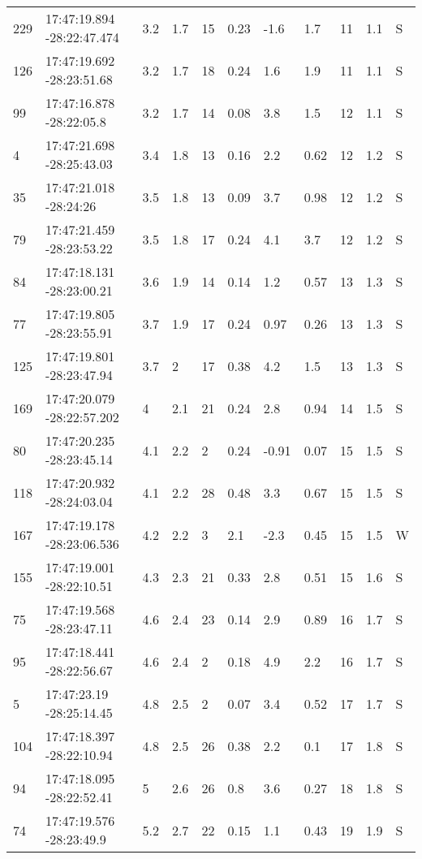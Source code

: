 \begin{deluxetable}[htp]
\begin{tabular}{lllllllllll}
229 & 17:47:19.894 -28:22:47.474 & 3.2 & 1.7 & 15 & 0.23 & -1.6 & 1.7 & 11 & 1.1\ee{25} & S \\
126 & 17:47:19.692 -28:23:51.68 & 3.2 & 1.7 & 18 & 0.24 & 1.6 & 1.9 & 11 & 1.1\ee{25} & S \\
99 & 17:47:16.878 -28:22:05.8 & 3.2 & 1.7 & 14 & 0.08 & 3.8 & 1.5 & 12 & 1.1\ee{25} & S \\
4 & 17:47:21.698 -28:25:43.03 & 3.4 & 1.8 & 13 & 0.16 & 2.2 & 0.62 & 12 & 1.2\ee{25} & S \\
35 & 17:47:21.018 -28:24:26 & 3.5 & 1.8 & 13 & 0.09 & 3.7 & 0.98 & 12 & 1.2\ee{25} & S \\
79 & 17:47:21.459 -28:23:53.22 & 3.5 & 1.8 & 17 & 0.24 & 4.1 & 3.7 & 12 & 1.2\ee{25} & S \\
84 & 17:47:18.131 -28:23:00.21 & 3.6 & 1.9 & 14 & 0.14 & 1.2 & 0.57 & 13 & 1.3\ee{25} & S \\
77 & 17:47:19.805 -28:23:55.91 & 3.7 & 1.9 & 17 & 0.24 & 0.97 & 0.26 & 13 & 1.3\ee{25} & S \\
125 & 17:47:19.801 -28:23:47.94 & 3.7 & 2 & 17 & 0.38 & 4.2 & 1.5 & 13 & 1.3\ee{25} & S \\
169 & 17:47:20.079 -28:22:57.202 & 4 & 2.1 & 21 & 0.24 & 2.8 & 0.94 & 14 & 1.5\ee{25} & S \\
80 & 17:47:20.235 -28:23:45.14 & 4.1 & 2.2 & 2 & 0.24 & -0.91 & 0.07 & 15 & 1.5\ee{25} & S \\
118 & 17:47:20.932 -28:24:03.04 & 4.1 & 2.2 & 28 & 0.48 & 3.3 & 0.67 & 15 & 1.5\ee{25} & S \\
167 & 17:47:19.178 -28:23:06.536 & 4.2 & 2.2 & 3 & 2.1 & -2.3 & 0.45 & 15 & 1.5\ee{25} & W \\
155 & 17:47:19.001 -28:22:10.51 & 4.3 & 2.3 & 21 & 0.33 & 2.8 & 0.51 & 15 & 1.6\ee{25} & S \\
75 & 17:47:19.568 -28:23:47.11 & 4.6 & 2.4 & 23 & 0.14 & 2.9 & 0.89 & 16 & 1.7\ee{25} & S \\
95 & 17:47:18.441 -28:22:56.67 & 4.6 & 2.4 & 2 & 0.18 & 4.9 & 2.2 & 16 & 1.7\ee{25} & S \\
5 & 17:47:23.19 -28:25:14.45 & 4.8 & 2.5 & 2 & 0.07 & 3.4 & 0.52 & 17 & 1.7\ee{25} & S \\
104 & 17:47:18.397 -28:22:10.94 & 4.8 & 2.5 & 26 & 0.38 & 2.2 & 0.1 & 17 & 1.8\ee{25} & S \\
94 & 17:47:18.095 -28:22:52.41 & 5 & 2.6 & 26 & 0.8 & 3.6 & 0.27 & 18 & 1.8\ee{25} & S \\
74 & 17:47:19.576 -28:23:49.9 & 5.2 & 2.7 & 22 & 0.15 & 1.1 & 0.43 & 19 & 1.9\ee{25} & S \\

\end{tabular}
\end{deluxetable}
